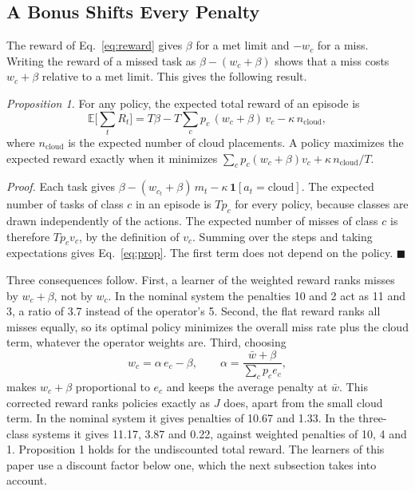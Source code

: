 \subsection{A Bonus Shifts Every Penalty}
The reward of Eq.~\eqref{eq:reward} gives $\beta$ for a met limit and $-w_c$ for a miss. Writing the reward of a missed task as $\beta - (w_c + \beta)$ shows that a miss costs $w_c + \beta$ relative to a met limit. This gives the following result.

\emph{Proposition 1.} For any policy, the expected total reward of an episode is
\begin{equation}
\mathbb{E}\Big[\sum_{t} R_t\Big] = T\beta - T\sum_c p_c\,(w_c + \beta)\, v_c - \kappa\, n_\text{cloud},
\label{eq:prop}
\end{equation}
where $n_\text{cloud}$ is the expected number of cloud placements. A policy maximizes the expected reward exactly when it minimizes $\sum_c p_c (w_c + \beta) v_c + \kappa\, n_\text{cloud}/T$.

\emph{Proof.} Each task gives $\beta - (w_{c_t} + \beta)\, m_t - \kappa\,\mathbf{1}[a_t=\text{cloud}]$. The expected number of tasks of class $c$ in an episode is $T p_c$ for every policy, because classes are drawn independently of the actions. The expected number of misses of class $c$ is therefore $T p_c v_c$, by the definition of $v_c$. Summing over the steps and taking expectations gives Eq.~\eqref{eq:prop}. The first term does not depend on the policy. \hfill$\blacksquare$

Three consequences follow. First, a learner of the weighted reward ranks misses by $w_c + \beta$, not by $w_c$. In the nominal system the penalties 10 and 2 act as 11 and 3, a ratio of 3.7 instead of the operator's 5. Second, the flat reward ranks all misses equally, so its optimal policy minimizes the overall miss rate plus the cloud term, whatever the operator weights are. Third, choosing
\begin{equation}
w_c = \alpha\, e_c - \beta, \qquad \alpha = \frac{\bar w + \beta}{\sum_c p_c e_c},
\label{eq:corrected}
\end{equation}
makes $w_c + \beta$ proportional to $e_c$ and keeps the average penalty at $\bar w$. This corrected reward ranks policies exactly as $J$ does, apart from the small cloud term. In the nominal system it gives penalties of 10.67 and 1.33. In the three-class systems it gives 11.17, 3.87 and 0.22, against weighted penalties of 10, 4 and 1. Proposition 1 holds for the undiscounted total reward. The learners of this paper use a discount factor below one, which the next subsection takes into account.

